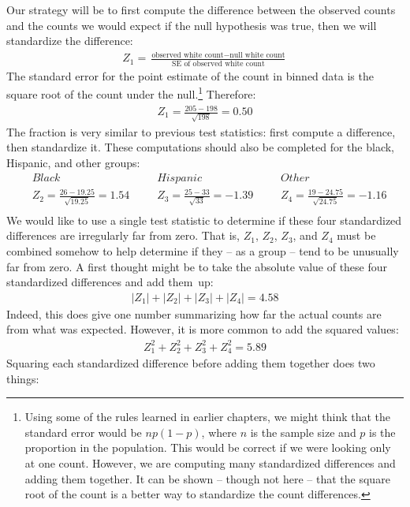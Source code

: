 Our strategy will be to first compute the difference between the observed counts and the counts we would expect if the null hypothesis was true, then we will standardize the difference:
\begin{align*}
Z_{1} = \frac{\text{observed white count} - \text{null white count}}
				{\text{SE of observed white count}}
\end{align*}
The standard error for the point estimate of the count in binned data is the square root of the count under the null.\footnote{Using some of the rules learned in earlier chapters, we might think that the standard error would be $np(1-p)$, where $n$ is the sample size and $p$ is the proportion in the population. This would be correct if we were looking only at one count. However, we are computing many standardized differences and adding them together. It can be shown -- though not here -- that the square root of the count is a better way to standardize the count differences.} Therefore:
\begin{align*}
Z_1 = \frac{205 - 198}{\sqrt{198}} = 0.50
\end{align*}
The fraction is very similar to previous test statistics: first compute a difference, then standardize it. These computations should also be completed for the black, Hispanic, and other groups:
\begin{align*}
&Black && Hispanic	&&Other \\
& Z_2 = \frac{26-19.25}{\sqrt{19.25}}=1.54\ \ \ \ 
	&& Z_3 = \frac{25-33}{\sqrt{33}}=-1.39\ \ \ \ 
	&& Z_4 = \frac{19-24.75}{\sqrt{24.75}}=-1.16 \\
\end{align*}
We would like to use a single test statistic to determine if these four standardized differences are irregularly far from zero. That is, $Z_1$, $Z_2$, $Z_3$, and $Z_4$ must be combined somehow to help determine if they -- as a group -- tend to be unusually far from zero. A first thought might be to take the absolute value of these four standardized differences and add them~up:
\begin{align*}
|Z_1| + |Z_2| + |Z_3| + |Z_4| = 4.58
\end{align*}
Indeed, this does give one number summarizing how far the actual counts are from what was expected. However, it is more common to add the squared values:
\begin{align*}
Z_1^2 + Z_2^2 + Z_3^2 + Z_4^2 = 5.89
\end{align*}
Squaring each standardized difference before adding them together does two things:
